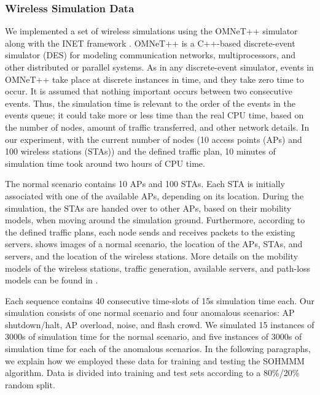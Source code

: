 \subsubsection{Wireless Simulation Data}
\label{sec:sohmmm_experiment_wifi}

We implemented a set of wireless simulations using the OMNeT++ \cite{omnetpp} simulator along with the INET framework \cite{inet}. OMNeT++ is a C++-based discrete-event simulator (DES) for modeling communication networks, multiprocessors, and other distributed or parallel systems.  
As in any discrete-event simulator, events in OMNeT++ take place at discrete instances in time, and they take zero time to occur. It is assumed that nothing important occurs between two consecutive events. Thus, the simulation time is relevant to the order of the events in the events queue; it could take more or less time than the real CPU time, based on the number of nodes, amount of traffic transferred, and other network details. In our experiment, with the current number of nodes (10 access points (APs) and 100 wireless stations (STAs)) and the defined traffic plan, 10 minutes of simulation time took around two hours of CPU time. 

The normal scenario contains 10 APs and 100 STAs. Each STA is initially associated with one of the available APs, depending on its location. During the simulation, the STAs are handed over to other APs, based on their mobility models, when moving around the simulation ground. Furthermore, according to the defined traffic plans, each node sends and receives packets to the existing servers.  shows images of a normal scenario, the location of the APs, STAs, and servers, and the location of the wireless stations. More details on the mobility models of the wireless stations, traffic generation, available servers, and path-loss models can be found in \cite{Anisa2017}.

Each sequence contains 40 consecutive time-slots of 15s simulation time each. Our simulation consists of one normal scenario and four anomalous scenarios: AP shutdown/\allowbreak halt, AP overload, noise, and flash crowd. We simulated 15 instances of 3000s of simulation time for the normal scenario, and five instances of 3000s of simulation time for each of the anomalous scenarios. In the following paragraphs, we explain how we employed these data for training and testing the SOHMMM algorithm.
Data is divided into training and test sets according to a 80\%/20\% random split. 

